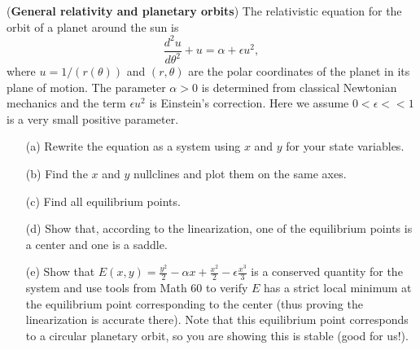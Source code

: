 \documentclass[11pt,letterpaper,boxed]{hmcpset}
\begin{document}
\begin{solution}
\vfill
\end{solution}
\newpage

\begin{problem}[3.] (\textbf{General relativity and planetary orbits}) The relativistic equation for the orbit of a planet around the sun is
\[  \frac{d^2u}{d \theta^2} + u = \alpha + \epsilon u^2,  \]
where $u=1/(r(\theta))$ and $(r,\theta)$ are the polar coordinates of the planet in its plane of motion.  
The parameter $\alpha > 0$ is determined from classical Newtonian mechanics and the term $\epsilon u^2$ is Einstein's correction.  Here we assume $0 < \epsilon <<1$ is a very small positive parameter.  
\begin{enumerate}
\item[(a)] Rewrite the equation as a system using $x$ and $y$ for your state variables.
\item[(b)] Find the $x$ and $y$ nullclines and plot them on the same axes. 
\item[(c)] Find all equilibrium points.
\item[(d)] Show that, according to the linearization, one of the equilibrium points is a center and one is a saddle.   
\item[(e)] Show that $E(x,y) = \frac{y^2}{2} - \alpha x + \frac{x^2}{2} - \epsilon \frac{x^3}{3}$ is a conserved quantity for the system and use tools from Math 60 to verify $E$ has a strict local minimum at the equilibrium point corresponding to the center (thus proving the linearization is accurate there).  Note that this equilibrium point corresponds to a circular planetary orbit, so you are showing this is stable (good for us!). 
\end{enumerate}
\end{problem}

\begin{solution}
\vfill
\end{solution}
\newpage
\end{document}
